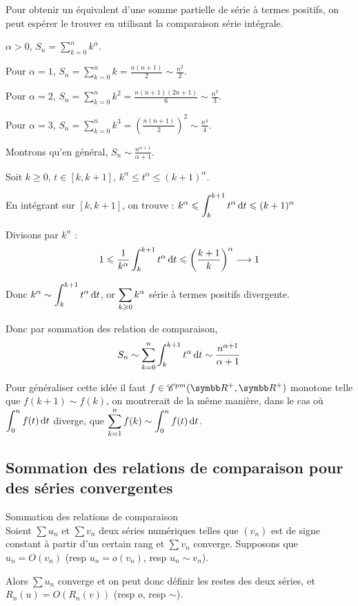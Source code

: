 \begin{exemple}
    Pour obtenir un équivalent d'une somme partielle de série à termes positifs, 
    on peut espérer le trouver en utilisant la comparaison série intégrale.

    $\alpha > 0$, $\displaystyle S_n = \sum_{k = 0 }^{n } k^\alpha$. 

    Pour $\alpha = 1$, $\displaystyle S_n = \sum_{k = 0 }^{n } k = \frac{n(n + 1)}{2} \sim \frac{n^2}{2}$.

    Pour $\alpha = 2$, $\displaystyle S_n = \sum_{k = 0 }^{n } k^2 = \frac{n(n + 1)(2n + 1)}{6} \sim \frac{n^3}{3}$.

    Pour $\alpha = 3$, $\displaystyle S_n = \sum_{k = 0 }^{n } k^3 = \left( \frac{n(n + 1)}{2} \right)^2 \sim \frac{n^4}{4}$.

    Montrons qu'en général, $\displaystyle S_n \sim \frac{n^{\alpha + 1}}{\alpha + 1}$.

    Soit $k \geqslant 0$, $t \in [k, k + 1], \, k^\alpha \leqslant t^\alpha \leqslant (k + 1)^\alpha$.

    En intégrant sur $[k, k + 1]$, on trouve : $\displaystyle k^\alpha \leqslant \int_{k}^{k + 1} t^\alpha \,\mathrm{d}t \leqslant (k + 1)^\alpha$

    Divisons par $k^\alpha$ : 
    \[1 \leqslant \frac 1 {k^\alpha} \int_{k}^{k + 1} t^\alpha \,\mathrm{d}t \leqslant \left( \frac{k+1} k \right)^\alpha \longrightarrow 1\]

    Donc $\displaystyle k^\alpha \sim \int_{k }^{k + 1} t^\alpha \,\mathrm{d}t$, or $\displaystyle \sum_{k \geqslant 0 } k^\alpha$ série à termes positifs divergente. 

    Donc par sommation des relation de comparaison, 
    \[S_n \sim \sum_{k = 0}^{n } \int_{k}^{k + 1} t^\alpha \,\mathrm{d}t \sim \frac{n^{\alpha + 1}}{\alpha + 1}\]
\end{exemple}

\begin{remarque}
Pour généraliser cette idée il faut $f\in  \mathscr C^{pm}(\R^+, \R^+)$ monotone telle que $f(k+1) \sim f(k)$, on
montrerait de la même manière, dans le cas où $\displaystyle\int_0^n f(t) \,\mathrm{d}t$ diverge, que $\displaystyle \sum_{k=1}^n f(k) \sim \int_0^n f(t) \,\mathrm{d}t$.
\end{remarque}

\subsection{Sommation des relations de comparaison pour des séries convergentes}

\begin{theoreme}{Sommation des relations de comparaison}{}\\
    Soient $\sum u_n$ et $\sum v_n$ deux séries numériques telles que 
    $(v_n)$ est de signe constant à partir d'un certain rang et $\sum v_n$ converge.
    Supposons que $u_n = O(v_n)$ (resp $u_n = o(v_n)$, resp $u_n \sim v_n$).

    \svspace Alors $\sum u_n$ converge et on peut donc définir les restes des deux séries, et 
    $\displaystyle R_n(u) = O(R_n(v))$ (resp $o$, resp $\sim$).
\end{theoreme}


